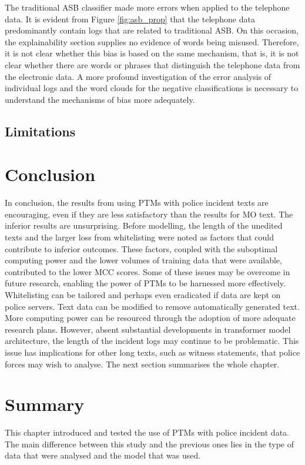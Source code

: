 The traditional ASB classifier made more errors when applied to the telephone data. It is evident from Figure \ref{fig:asb_prop}  that the telephone data predominantly contain logs that are related to traditional ASB. On this occasion, the explainability section supplies no evidence of words being misused. Therefore, it is not clear whether this bias is based on the same mechanism, that is, it is not clear whether there are words or phrases that distinguish the telephone data from the electronic data. A more profound investigation of the error analysis of individual logs and the word clouds for the negative classifications is necessary to understand the mechanisms of bias more adequately.

\subsection{Limitations}

\section{Conclusion} In conclusion, the results from using PTMs with police incident texts are encouraging, even if they are less satisfactory than the results for MO text. The inferior results are unsurprising. Before modelling, the length of the unedited texts and the larger loss from whitelisting were noted as factors that could contribute to inferior outcomes. These factors, coupled with the suboptimal computing power and the lower volumes of training data that were available, contributed to the lower MCC scores. Some of these issues may be overcome in future research, enabling the power of PTMs to be harnessed more effectively. Whitelisting can be tailored and perhaps even eradicated if data are kept on police servers. Text data can be modified to remove automatically generated text. More computing power can be resourced through the adoption of more adequate research plans. However, absent substantial developments in transformer model architecture, the length of the incident logs may continue to be problematic. This issue has implications for other long texts, such as witness statements, that police forces may wish to analyse. The next section summarises the whole chapter.

\section{Summary} This chapter introduced and tested the use of PTMs with police incident data. The main difference between this study and the previous ones lies in the type of data that were analysed and the model that was used.


